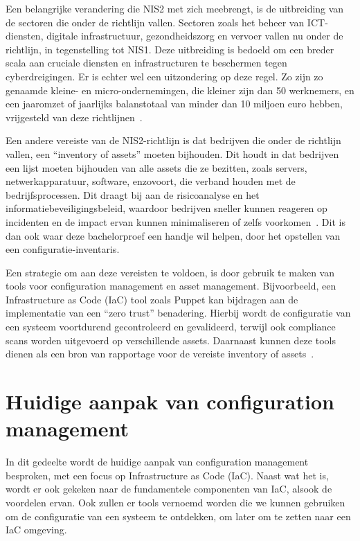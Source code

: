 Een belangrijke verandering die NIS2 met zich meebrengt, is de uitbreiding van de sectoren die onder de richtlijn vallen.
Sectoren zoals het beheer van ICT-diensten, digitale infrastructuur, gezondheidszorg en vervoer vallen nu onder de richtlijn, in tegenstelling tot NIS1.
Deze uitbreiding is bedoeld om een breder scala aan cruciale diensten en infrastructuren te beschermen tegen cyberdreigingen.
Er is echter wel een uitzondering op deze regel.
Zo zijn zo genaamde kleine- en micro-ondernemingen, die kleiner zijn dan 50 werknemers, en een jaaromzet of jaarlijks balanstotaal van minder dan 10 miljoen euro hebben, vrijgesteld van deze richtlijnen~\autocite{nis2-eu-be}.

Een andere vereiste van de NIS2-richtlijn is dat bedrijven die onder de richtlijn vallen, een ``inventory of assets'' moeten bijhouden.
Dit houdt in dat bedrijven een lijst moeten bijhouden van alle assets die ze bezitten, zoals servers, netwerkapparatuur, software, enzovoort, die verband houden met de bedrijfsprocessen.
Dit draagt bij aan de risicoanalyse en het informatiebeveiligingsbeleid, waardoor bedrijven sneller kunnen reageren op incidenten en de impact ervan kunnen minimaliseren of zelfs voorkomen~\autocite{dragos-nis2}.
Dit is dan ook waar deze bachelorproef een handje wil helpen, door het opstellen van een configuratie-inventaris.

Een strategie om aan deze vereisten te voldoen, is door gebruik te maken van tools voor configuration management en asset management.
Bijvoorbeeld, een Infrastructure as Code (IaC) tool zoals Puppet kan bijdragen aan de implementatie van een ``zero trust'' benadering.
Hierbij wordt de configuratie van een systeem voortdurend gecontroleerd en gevalideerd, terwijl ook compliance scans worden uitgevoerd op verschillende assets. Daarnaast kunnen deze tools dienen als een bron van rapportage voor de vereiste inventory of assets~\autocite{puppet-nis2}.


\section{Huidige aanpak van configuration management}%
\label{sec:huidige-aanpak-van-configuration-management}

In dit gedeelte wordt de huidige aanpak van configuration management besproken, met een focus op Infrastructure as Code (IaC).
Naast wat het is, wordt er ook gekeken naar de fundamentele componenten van IaC, alsook de voordelen ervan.
Ook zullen er tools vernoemd worden die we kunnen gebruiken om de configuratie van een systeem te ontdekken, om later om te zetten naar een IaC omgeving.

